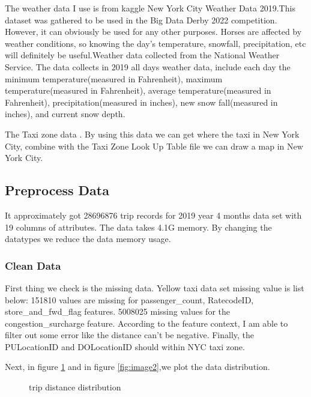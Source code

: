 \documentclass[11pt]{article}
\begin{document}
The weather data I use is from kaggle New York City Weather Data 2019.This dataset was gathered to be used in the Big Data Derby 2022 competition. However, it can obviously be used for any other purposes. Horses are affected by weather conditions, so knowing the day's temperature, snowfall, precipitation, etc will definitely be useful.Weather data collected from the National Weather Service. The data collects in 2019 all days weather data, include each day the minimum temperature(measured in Fahrenheit), maximum temperature(measured in Fahrenheit), average temperature(measured in Fahrenheit), precipitation(measured in inches), new snow fall(measured in inches), and current snow depth.\cite{kaggle}

The Taxi zone data \cite{TaxiZone}. By using this data we can get where the taxi in New York City, combine with the Taxi Zone Look Up Table file we can draw a map in New York City.

\subsection{Preprocess Data}

It approximately got 28696876 trip records for 2019 year 4 months data set with 19 columns of attributes. The data takes 4.1G memory. By changing the datatypes we reduce the data memory usage.

\subsubsection{Clean Data}

First thing we check is the missing data. Yellow taxi data set  missing value is list below:
151810 values are missing for passenger\_count, RatecodeID, store\_and\_fwd\_flag features. 5008025 missing values for the congestion\_surcharge feature. According to the feature context, I am able to filter out some error like the distance can't be negative. Finally, the PULocationID and DOLocationID should within NYC taxi zone.\cite{TaxiZone}


Next, in ﬁgure \ref{fig:image1} and in ﬁgure \ref{fig:image2},we plot the data distribution.

\begin{figure}[!h]
    \centering
    \caption{trip distance distribution} %
    \label{fig:image1}
\end{figure}
\end{document}

